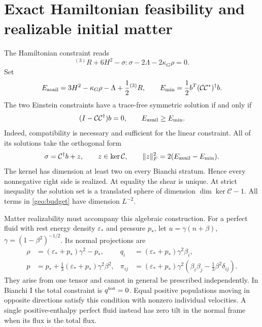 \section{Exact Hamiltonian feasibility and realizable initial matter}

The Hamiltonian constraint reads
\begin{equation}
 {}^{(3)}R+6H^2-\sigma:\sigma-2\Lambda-2\kappa_G\rho=0.
 \label{geo:hamiltonian}
\end{equation}
Set
\begin{equation}
 E_{\rm avail}=3H^2-\kappa_G\rho-\Lambda+\frac12{}^{(3)}R,
 \qquad E_{\min}=\frac12 b^T(\mathcal C\mathcal C^*)^\dagger b.
 \label{geo:budget}
\end{equation}
The two Einstein constraints have a trace-free symmetric solution if and only if
\begin{equation}
 (I-\mathcal C\mathcal C^\dagger)b=0,
 \qquad E_{\rm avail}\ge E_{\min}.
 \label{geo:feasibility}
\end{equation}
Indeed, compatibility is necessary and sufficient for the linear constraint. All of its solutions take the orthogonal form
\begin{equation}
 \sigma=\mathcal C^\dagger b+z,\qquad z\in\ker\mathcal C,
 \qquad \|z\|_F^2=2(E_{\rm avail}-E_{\min}).
 \label{geo:constraint_sphere}
\end{equation}
The kernel has dimension at least two on every Bianchi stratum. Hence every nonnegative right side is realized. At equality the shear is unique. At strict inequality the solution set is a translated sphere of dimension $\dim\ker\mathcal C-1$. All terms in \eqref{geo:budget} have dimension $L^{-2}$.

Matter realizability must accompany this algebraic construction. For a perfect fluid with rest energy density $\varepsilon_*$ and pressure $p_*$, let $u=\gamma(n+\beta)$, $\gamma=(1-\beta^2)^{-1/2}$. Its normal projections are
\begin{align}
 \rho&=(\varepsilon_*+p_*)\gamma^2-p_*,&
 q_i&=(\varepsilon_*+p_*)\gamma^2\beta_i,\nonumber\\
 p&=p_*+\frac13(\varepsilon_*+p_*)\gamma^2\beta^2,&
 \pi_{ij}&=(\varepsilon_*+p_*)\gamma^2
   \left(\beta_i\beta_j-\tfrac13\beta^2\delta_{ij}\right).
 \label{geo:tilted_stress}
\end{align}
They arise from one tensor and cannot in general be prescribed independently. In Bianchi I the total constraint is $q^{\rm tot}=0$. Equal positive populations moving in opposite directions satisfy this condition with nonzero individual velocities. A single positive-enthalpy perfect fluid instead has zero tilt in the normal frame when its flux is the total flux.

